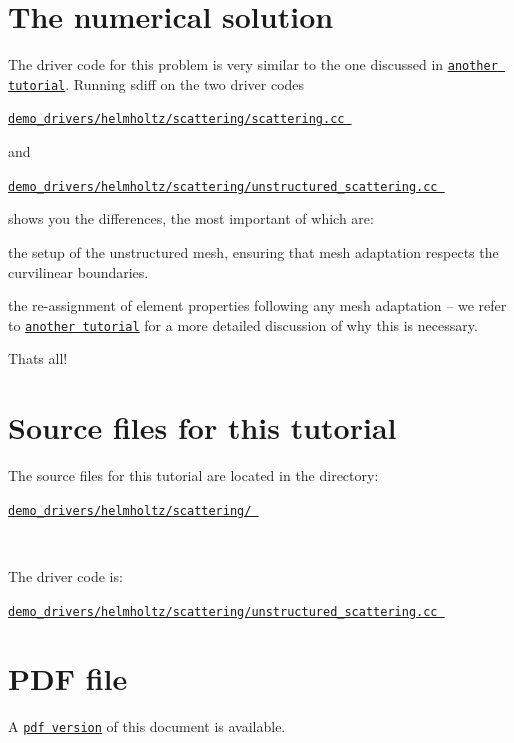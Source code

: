 \hypertarget{index_num}{}\section{The numerical solution}\label{index_num}
The driver code for this problem is very similar to the one discussed in \href{../../scattering/html/index.html}{\tt another tutorial}. Running {\ttfamily sdiff} on the two driver codes \begin{center} \href{../../../../demo_drivers/helmholtz/scattering/scattering.cc}{\tt demo\+\_\+drivers/helmholtz/scattering/scattering.\+cc } \end{center}  and \begin{center} \href{../../../../demo_drivers/helmholtz/scattering/unstructured_scattering.cc}{\tt demo\+\_\+drivers/helmholtz/scattering/unstructured\+\_\+scattering.\+cc } \end{center}  shows you the differences, the most important of which are\+:
\begin{DoxyItemize}
\item the setup of the unstructured mesh, ensuring that mesh adaptation respects the curvilinear boundaries. ~\newline
~\newline

\item the re-\/assignment of element properties following any mesh adaptation -- we refer to \href{../../../meshes/mesh_from_inline_triangle/html/index.html}{\tt another tutorial} for a more detailed discussion of why this is necessary.
\end{DoxyItemize}That\textquotesingle{}s all!



 

\hypertarget{index_sources}{}\section{Source files for this tutorial}\label{index_sources}

\begin{DoxyItemize}
\item The source files for this tutorial are located in the directory\+:~\newline
~\newline
 \begin{center} \href{../../../../demo_drivers/helmholtz/scattering}{\tt demo\+\_\+drivers/helmholtz/scattering/ } \end{center} ~\newline

\item The driver code is\+: ~\newline
~\newline
 \begin{center} \href{../../../../demo_drivers/helmholtz/scattering/unstructured_scattering.cc}{\tt demo\+\_\+drivers/helmholtz/scattering/unstructured\+\_\+scattering.\+cc } \end{center} 
\end{DoxyItemize}



 

 \hypertarget{index_pdf}{}\section{P\+D\+F file}\label{index_pdf}
A \href{../latex/refman.pdf}{\tt pdf version} of this document is available. 
